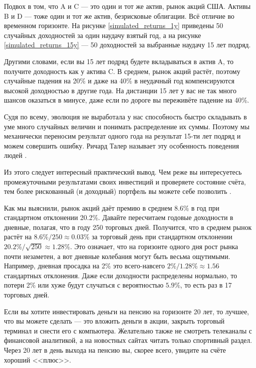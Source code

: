 Подвох в том, что A и C --- это один и тот же актив, рынок акций США. Активы B и 
D --- тоже один и тот же актив, безрисковые облигации. Всё отличие во временном 
горизонте. На рисунке \ref{simulated_returns_1y} приведены 50 случайных 
доходностей за один наудачу взятый год, а на рисунке \ref{simulated_returns_15y} 
--- 50 доходностей за выбранные наудачу 15 лет подряд.

Другими словами, если вы 15 лет подряд будете вкладываться в актив A, то 
получите доходность как у актива C. В среднем, рынок акций растёт, поэтому 
случайные падения на 20\% и даже на 40\% в неудачный год компенсируются высокой 
доходностью в другие года. На дистанции 15 лет у вас не так много шансов 
оказаться в минусе, даже если по дороге вы переживёте падение на 40\%.

Судя по всему, эволюция не выработала у нас способность быстро складывать в уме 
много случайных величин и понимать распределение их суммы. Поэтому мы 
механически переносим результат одного года на результат 15-ти лет подряд и 
можем совершить ошибку. Ричард Талер называет эту особенность поведения людей 
\cite{benartzi1995myopic}.

Из этого следует интересный практический вывод. Чем реже вы интересуетесь 
промежуточными результатами своих инвестиций и проверяете состояние счёта, тем 
более рискованный (и доходный) портфель вы можете себе позволить 
\cite[ch.~20]{thaler2015misbehaving}.

Как мы выяснили, рынок акций даёт премию в среднем 8.6\% в год при стандартном 
отклонении 20.2\%. Давайте пересчитаем годовые доходности в дневные, полагая, 
что в году 250 торговых дней. Получится, что в среднем рынок растёт на
$8.6\% / 250 \approx 0.03\%$ за торговый день при стандартном отклонении $20.2\% 
/ \sqrt{250} \approx 1.28\%$. Это означает, что на горизонте одного дня рост 
рынка почти незаметен, а вот дневные колебания могут быть весьма ощутимыми. 
Например, дневная просадка на 2\% это всего-навсего $2\%/1.28\% \approx 1.56$ 
стандартных отклонения. Даже если доходности распределены нормально, то потери 
2\% или хуже будут случаться с вероятностью $5.9\%$, то есть раз в 17 торговых 
дней.

Если вы хотите инвестировать деньги на пенсию на горизонте 20 лет, то лучшее, 
что вы можете сделать --- это вложить деньги в акции, закрыть торговый терминал 
и снести его с компьютера. Желательно также не смотреть телеканалы с финансовой 
аналитикой, а на новостных сайтах читать только спортивный раздел. Через 20 лет 
в день выхода на пенсию вы, скорее всего, увидите на счёте хороший <<плюс>>.


